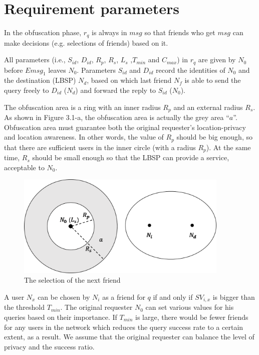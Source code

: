 \section{ Requirement parameters}

\noindent In the obfuscation phase, ${r}_{q}$ is always in $msg$ so that friends who get $msg$ can make decisions (e.g. selections of friends) based on it.

All parameters (i.e., ${S}_{id}$, ${D}_{id}$, ${R}_{p}$, ${R}_{s}$, ${L}_{s}$ ,${T}_{min}$ and ${C}_{max}$) in ${r}_{q}$ are given by ${N}_{0}$ before ${Emsg}_{1}$ leaves ${N}_{0}$. Parameters ${S}_{id}$ and ${D}_{id}$ record the identities of ${N}_{0}$ and the destination (LBSP) ${N}_{d}$, based on which last friend ${N}_{f}$ is able to send the query freely to ${D}_{id}$ (${N}_{d}$) and forward the reply to ${S}_{id}$ (${N}_{0}$).

The obfuscation area is a ring with an inner radius ${R}_{p}$ and an external radius ${R}_{s}$. As shown in Figure 3.1-a, the obfuscation area is actually the grey area ``$a$''. Obfuscation area must guarantee both the original requester's location-privacy and location awareness. In other words, the value of ${R}_{p}$ should be big enough, so that there are sufficient users in the inner circle (with a radius ${R}_{p}$). At the same time, ${R}_{s}$ should be small enough so that the LBSP can provide a service, acceptable to ${N}_{0}$. 

\begin{figure} [H]
  \centering 
  \includegraphics[width=4.0in]{figures/FIG_SelectionOfNextFriend.png}
  \caption{The selection of the next friend} 
  \label{fig:SelectionOfNxtFriend} %
\end{figure}

A user ${N}_{x}$ can be chosen by ${N}_{i}$ as a friend for $q$ if and only if ${SV}_{i,x}$ is bigger than the threshold ${T}_{min}$. The original requester ${N}_{0}$ can set various values for his queries based on their importance. If ${T}_{min}$ is large, there would be fewer friends for any users in the network which reduces the query success rate to a certain extent, as a result. We assume that the original requester can balance the level of privacy and the success ratio. 

